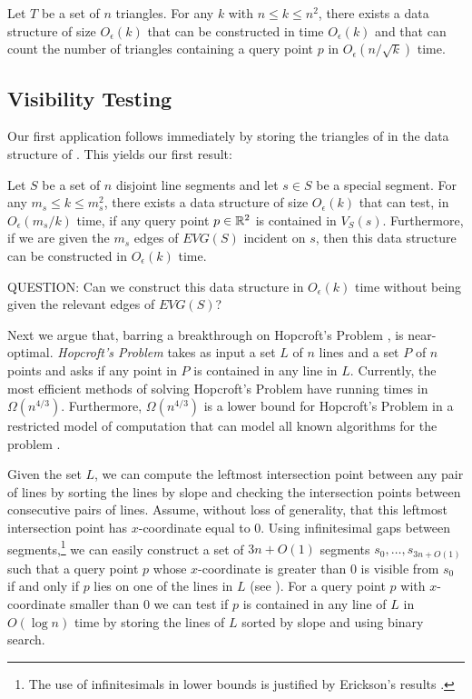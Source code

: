 \documentclass{patmorin}
\newcommand{\EVG}{\mathit{EVG}}
\newcommand{\Oe}{O_\epsilon}
\begin{document}
\begin{thm}[\cite{m92,ae99}]
Let $T$ be a set of $n$ triangles. For any $k$ with $n\le k\le n^2$, there
exists a data structure of size $\Oe(k)$ that can be constructed in time
$\Oe(k)$ and that can count the number of triangles containing a query
point $p$ in $\Oe(n/\sqrt{k})$ time.
\end{thm}


\subsection{Visibility Testing}

Our first application follows immediately by storing the triangles of
 in the data structure of .  This
yields our first result:

\begin{thm}
Let $S$ be a set of $n$ disjoint line segments and let $s\in S$
be a special segment.  For any $m_s\le k\le m_s^2$, there exists a
data structure of size $\Oe(k)$ that can test, in $\Oe(m_s/k)$ time,
if any query point $p\in\mathbb{R}^2$ is contained in $V_S(s)$.  Furthermore,
if we are given the $m_s$ edges of $\EVG(S)$ incident on $s$, then this
data structure can be constructed in $\Oe(k)$ time.
\end{thm}

QUESTION: Can we construct this data structure in $\Oe(k)$ time without
being given the relevant edges of $\EVG(S)$?

Next we argue that, barring a breakthrough on Hopcroft's Problem
\cite{e96},  is near-optimal.  \emph{Hopcroft's
Problem} takes as input a set $L$ of $n$ lines and a set $P$ of $n$ points
and asks if any point in $P$ is contained in any line in $L$. Currently,
the most efficient methods of solving Hopcroft's Problem have running
times in $\Omega(n^{4/3})$.  Furthermore, $\Omega(n^{4/3})$ is a lower
bound for Hopcroft's Problem in a restricted model of computation that
can model all known algorithms for the problem \cite{e96}.

Given the set $L$, we can compute the leftmost intersection point between
any pair of lines by sorting the lines by slope and checking the
intersection points between consecutive pairs of lines.  Assume, without
loss of generality, that this leftmost intersection point has
$x$-coordinate equal to 0. Using infinitesimal gaps between
segments,\footnote{The use of infinitesimals in lower bounds is justified
by Erickson's results \cite{e99b}.} we can easily construct a set of $3n+O(1)$
segments $s_0,\ldots,s_{3n+O(1)}$ such that a query point $p$ whose
$x$-coordinate is greater than 0 is visible from $s_0$ if and only if $p$
lies on one of the lines in $L$ (see ).  For a query point
$p$ with $x$-coordinate smaller than 0 we can test if $p$ is contained in
any line of $L$ in $O(\log n)$ time by storing the lines of $L$ sorted by
slope and using binary search.
\end{document}
